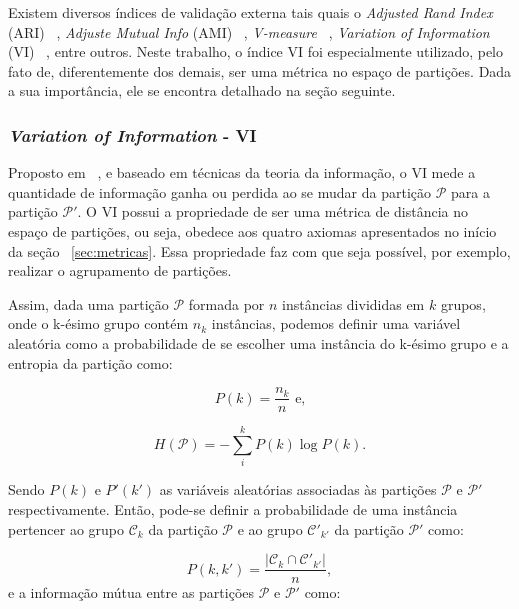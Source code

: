 Existem diversos índices de validação externa tais quais o \emph{Adjusted Rand Index} (ARI) ~\parencite{Hubert1985}, \emph{Adjuste Mutual Info } (AMI) ~\parencite{AMI}, \emph{V-measure} ~\parencite{V_measure}, \emph{Variation of Information} (VI) ~\parencite{Meila}, entre outros. Neste trabalho, o índice VI foi especialmente utilizado, pelo fato de, diferentemente dos demais, ser uma métrica no espaço de partições. Dada a sua importância, ele se encontra detalhado na seção seguinte.


\subsubsection{\emph{Variation of Information} - VI} \label{sec:VI}

Proposto em ~\parencite{Meila}, e baseado em técnicas da teoria da informação, o VI mede a quantidade de informação ganha ou perdida ao se mudar da partição $\mathcal{P}$ para a partição $\mathcal{P'}$. O VI possui a propriedade de ser uma métrica de distância no espaço de partições, ou seja, obedece aos quatro axiomas apresentados no início da seção ~\ref{sec:metricas}. Essa propriedade faz com que seja possível, por exemplo, realizar o agrupamento de partições. 

Assim, dada uma partição $\mathcal{P}$ formada por $n$ instâncias divididas em $k$ grupos, onde o k-ésimo grupo contém $n_k$ instâncias, podemos definir uma variável aleatória como a probabilidade de se escolher uma instância do k-ésimo grupo e a entropia da partição como:

\begin{equation}
P(k) = \frac{n_k}{n}\text{ e,}
\end{equation}

\begin{equation}
H(\mathcal{P}) = -\sum_{i}^{k}P(k) \log P(k).
\end{equation}

Sendo $P(k)$ e $P'(k')$ as variáveis aleatórias associadas às partições $\mathcal{P}$ e $\mathcal{P'}$ respectivamente. Então, pode-se definir a probabilidade de uma instância pertencer ao grupo $\mathcal{C}_k$ da partição $\mathcal{P}$ e ao grupo $\mathcal{C'}_{k'}$ da partição $\mathcal{P'}$ como:

\begin{equation}
P(k,k') = \frac{|\mathcal{C}_k\cap \mathcal{C'}_{k'}|}{n},
\end{equation}
e a informação mútua entre as partições $\mathcal{P}$ e $\mathcal{P'}$ como:

